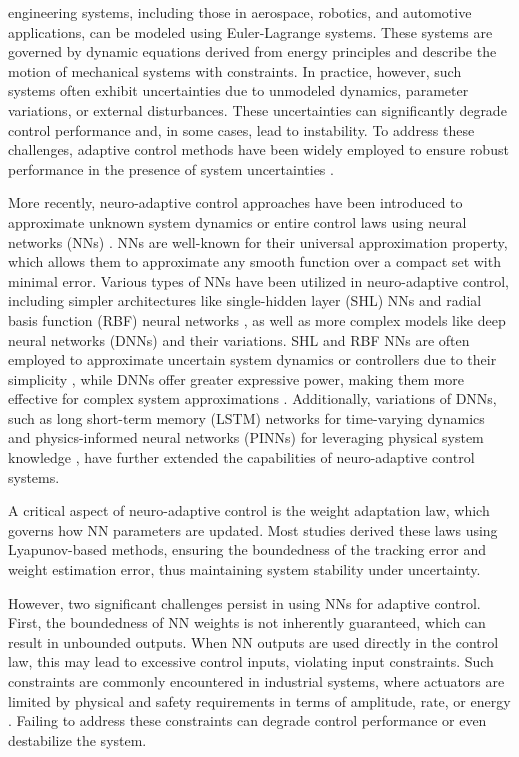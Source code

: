 \documentclass[lettersize,journal]{IEEEtran}
\begin{document}
 engineering systems, including those in aerospace, robotics, and automotive applications, can be modeled using Euler-Lagrange systems. 
These systems are governed by dynamic equations derived from energy principles and describe the motion of mechanical systems with constraints. 
In practice, however, such systems often exhibit uncertainties due to unmodeled dynamics, parameter variations, or external disturbances. 
These uncertainties can significantly degrade control performance and, in some cases, lead to instability. 
To address these challenges, adaptive control methods have been widely employed to ensure robust performance in the presence of system uncertainties \cite{Ioannou:2006aa, Tao:2003aa}.

More recently, neuro-adaptive control approaches have been introduced to approximate unknown system dynamics or entire control laws using neural networks (NNs) \cite{Farrell:2006aa}. 
NNs are well-known for their universal approximation property, which allows them to approximate any smooth function over a compact set with minimal error. 
Various types of NNs have been utilized in neuro-adaptive control, including simpler architectures like single-hidden layer (SHL) NNs \cite{Ge:2010aa, Yesildirek:1995aa} and radial basis function (RBF) neural networks \cite{Liu:2013ab,Ge:2002aa}, as well as more complex models like deep neural networks (DNNs) \cite{Patil:2022aa} and their variations. 
SHL and RBF NNs are often employed to approximate uncertain system dynamics or controllers due to their simplicity \cite{Esfandiari:2014aa,Esfandiari:2015aa,Yesildirek:1995aa,Gao:2006aa}, while DNNs offer greater expressive power, making them more effective for complex system approximations \cite{Rolnick:2018aa}. 
Additionally, variations of DNNs, such as long short-term memory (LSTM) networks for time-varying dynamics \cite{Liu:2013ab} and physics-informed neural networks (PINNs) for leveraging physical system knowledge \cite{Hart:2024aa}, have further extended the capabilities of neuro-adaptive control systems.

A critical aspect of neuro-adaptive control is the weight adaptation law, which governs how NN parameters are updated. 
Most studies derived these laws using Lyapunov-based methods, ensuring the boundedness of the tracking error and weight estimation error, thus maintaining system stability under uncertainty.

However, two significant challenges persist in using NNs for adaptive control. 
First, the boundedness of NN weights is not inherently guaranteed, which can result in unbounded outputs. 
When NN outputs are used directly in the control law, this may lead to excessive control inputs, violating input constraints. 
Such constraints are commonly encountered in industrial systems, where actuators are limited by physical and safety requirements in terms of amplitude, rate, or energy \cite{Esfandiari:2021aa}. 
Failing to address these constraints can degrade control performance or even destabilize the system.
\end{document}
